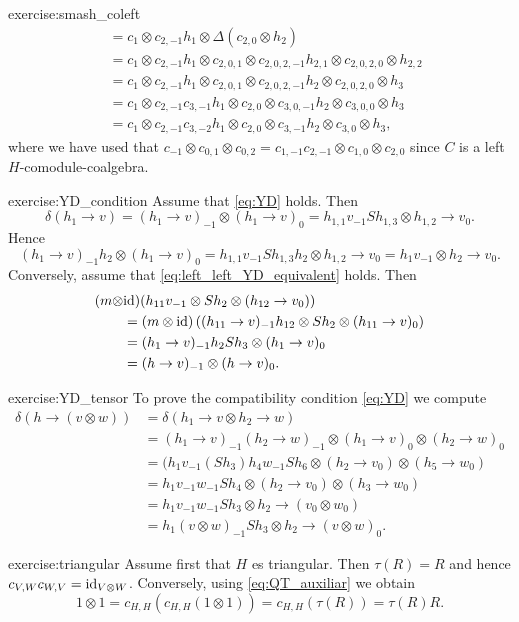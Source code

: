 \begin{sol}{exercise:smash_coleft}
\begin{align*}
 & =c_{1}\otimes c_{2,-1}h_{1}\otimes\Delta(c_{2,0}\otimes h_{2})\\
 & =c_{1}\otimes c_{2,-1}h_{1}\otimes c_{2,0,1}\otimes c_{2,0,2,-1}h_{2,1}\otimes c_{2,0,2,0}\otimes h_{2,2}\\
 & =c_{1}\otimes c_{2,-1}h_{1}\otimes c_{2,0,1}\otimes c_{2,0,2,-1}h_{2}\otimes c_{2,0,2,0}\otimes h_{3}\\
 & =c_{1}\otimes c_{2,-1}c_{3,-1}h_{1}\otimes c_{2,0}\otimes c_{3,0,-1}h_{2}\otimes c_{3,0,0}\otimes h_{3}\\
 & =c_{1}\otimes c_{2,-1}c_{3,-2}h_{1}\otimes c_{2,0}\otimes c_{3,-1}h_{2}\otimes c_{3,0}\otimes h_{3},
\end{align*}
where we have used that $c_{-1}\otimes c_{0,1}\otimes c_{0,2}=c_{1,-1}c_{2,-1}\otimes c_{1,0}\otimes c_{2,0}$
since $C$ is a left $H$-comodule-coalgebra.
\end{sol}

\begin{sol}{exercise:YD_condition}
Assume that \eqref{eq:YD} holds. Then 
\[
\delta(h_{1}\to v)=(h_{1}\to v)_{-1}\otimes(h_{1}\to v)_{0}=h_{1,1}v_{-1}Sh_{1,3}\otimes h_{1,2}\to v_{0}.
\]
Hence 
\[
(h_{1}\to v)_{-1}h_{2}\otimes(h_{1}\to v)_{0}=h_{1,1}v_{-1}Sh_{1,3}h_{2}\otimes h_{1,2}\to v_{0}=h_{1}v_{-1}\otimes h_{2}\to v_{0}.
\]
Conversely, assume that \eqref{eq:left_left_YD_equivalent} holds. Then
\begin{align*}
	(m\otimes&\mathrm{id})(h_{11}v_{-1}\otimes Sh_2\otimes(h_{12}\rightarrow v_0) )\\  
	&=(m\otimes\mathrm{id})\left( (h_{11}\rightarrow v)_{-1}h_{12}\otimes Sh_2\otimes (h_{11}\rightarrow v)_0 \right)\\
	&=(h_1\rightarrow v)_{-1}h_2Sh_3\otimes (h_1\rightarrow v)_0\\
	&=(h\rightarrow v)_{-1}\otimes (h\rightarrow v)_0.
\end{align*}
\end{sol}

\begin{sol}{exercise:YD_tensor}
To prove the compatibility condition \eqref{eq:YD} we compute
\begin{align*}
\delta(h\rightarrow(v\otimes w)) & =\delta(h_{1}\rightarrow v\otimes h_{2}\rightarrow w)\\
 & =(h_{1}\rightarrow v)_{-1}(h_{2}\rightarrow w)_{-1}\otimes(h_{1}\rightarrow v)_{0}\otimes(h_{2}\rightarrow w)_{0}\\
 & =(h_{1}v_{-1}(Sh_{3})h_{4}w_{-1}Sh_{6}\otimes(h_{2}\rightarrow v_{0})\otimes(h_{5}\rightarrow w_{0})\\
 & =h_{1}v_{-1}w_{-1}Sh_{4}\otimes(h_{2}\rightarrow v_{0})\otimes(h_{3}\rightarrow w_{0})\\
 & =h_{1}v_{-1}w_{-1}Sh_{3}\otimes h_{2}\rightarrow(v_{0}\otimes w_{0})\\
 & =h_{1}(v\otimes w)_{-1}Sh_{3}\otimes h_{2}\rightarrow(v\otimes w)_{0}.
\end{align*}
\end{sol}


\begin{sol}{exercise:triangular}
Assume first that $H$ es triangular. Then $\tau(R)=R$ and hence
$c_{V,W}c_{W,V}=\mathrm{id}_{V\otimes W}$. Conversely, using 
\eqref{eq:QT_auxiliar} we obtain 
\[
1\otimes1=c_{H,H}(c_{H,H}(1\otimes1))=c_{H,H}(\tau(R))=\tau(R)R.
\]
\end{sol}